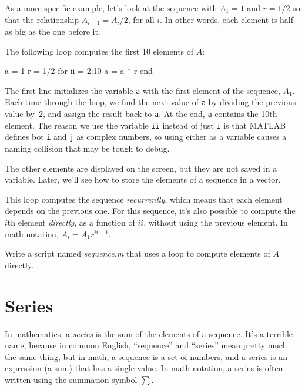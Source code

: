 \documentclass[../../book.tex]{subfiles}
\begin{document}
As a more specific example, let's
look at the sequence with $A_1 = 1$ and $r=1/2$ so that the relationship $A_{i+1} = A_i/2$, for all $i$.  In other words, each element is half as big as the one before it.

The following loop computes the first 10 elements of $A$:

\begin{code}
a = 1
r = 1/2
for ii = 2:10
    a = a * r
end
\end{code}

The first line initializes the variable \lstinline{a} with the first element of the sequence, $A_1$. Each time through the loop, we find the next value of \lstinline{a}
by dividing the previous value by~2, and assign the result back to \lstinline{a}.
At the end, \lstinline{a} contains the 10th element.  The reason we use the variable \lstinline{ii} instead of just \lstinline{i} is that MATLAB defines bot \lstinline{i} and \lstinline{j} as complex numbers, so using either as a variable causes a naming collision that may be tough to debug.

The other elements are displayed on the screen, but they are not saved in a variable.
Later, we'll see how to store the elements of a sequence in a vector.


This loop computes the sequence \emph{recurrently}, which means that each element depends on the previous one. For this sequence, it's also possible to compute the $i$th element \emph{directly}, as a function of $ii$, without using the previous element. In math notation, $A_i = A_1 r^{ii-1}$.

\begin{ex}
Write a script named \emph{sequence.m} that uses a loop to
compute elements of $A$ \mbox{directly}.
\end{ex}

\section{Series}
\label{series}

In mathematics, a \emph{series} is the sum of the elements of a sequence.  It's a terrible name, because in common English, ``sequence'' and ``series'' mean pretty much the same thing, but in math, a sequence is a set of numbers, and a series is an expression (a sum) that has a single value.  In math notation,  a series is often written using the summation symbol $\sum$.
\end{document}
